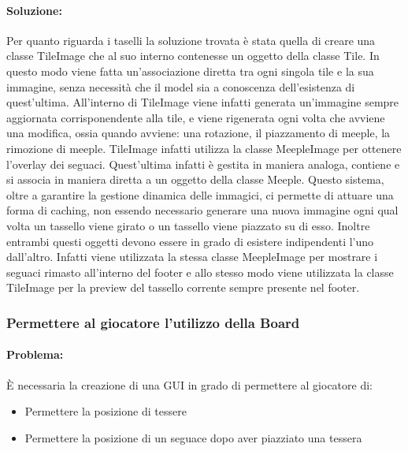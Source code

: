 \paragraph{Soluzione:}
Per quanto riguarda i taselli la soluzione trovata è stata quella di creare una classe TileImage che al suo interno contenesse un oggetto della classe Tile. In questo modo viene fatta un'associazione diretta tra ogni singola tile e la sua immagine, senza necessità che il model sia a conoscenza dell'esistenza di quest'ultima. All'interno di TileImage viene infatti generata un'immagine sempre aggiornata corrisponendente alla tile, e viene rigenerata ogni volta che avviene una modifica, ossia quando avviene: una rotazione, il piazzamento di meeple, la rimozione di meeple. TileImage infatti utilizza la classe MeepleImage per ottenere l'overlay dei seguaci. Quest'ultima infatti è gestita in maniera analoga, contiene e si associa in maniera diretta a un oggetto della classe Meeple. Questo sistema, oltre a garantire la gestione dinamica delle immagici, ci permette di attuare una forma di caching, non essendo necessario generare una nuova immagine ogni qual volta un tassello viene girato o un tassello viene piazzato su di esso. Inoltre entrambi questi oggetti devono essere in grado di esistere indipendenti l'uno dall'altro. Infatti viene utilizzata la stessa classe MeepleImage per mostrare i seguaci rimasto all'interno del footer e allo stesso modo viene utilizzata la classe TileImage per la preview del tassello corrente sempre presente nel footer.

\subsubsection*{Permettere al giocatore l'utilizzo della Board}
\paragraph{Problema:}
È necessaria la creazione di una GUI in grado di permettere al giocatore di:
\begin{itemize}
    \item Permettere la posizione di tessere
    \item Permettere la posizione di un seguace dopo aver piazziato una tessera
\end{itemize}
